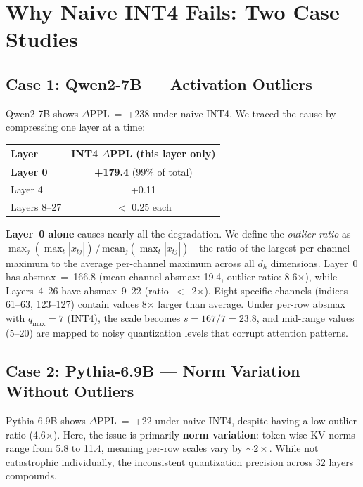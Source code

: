 \documentclass[11pt]{article}
\begin{document}
\section{Why Naive INT4 Fails: Two Case Studies}

\subsection{Case 1: Qwen2-7B --- Activation Outliers}

Qwen2-7B shows $\Delta$PPL~=~+238 under naive INT4. We traced the cause by compressing one layer at a time:

\begin{table}[h]
\centering
\small
\begin{tabular}{lc}
\toprule
Layer & INT4 $\Delta$PPL (this layer only) \\
\midrule
\textbf{Layer 0} & \textbf{+179.4} (99\% of total) \\
Layer 4 & +0.11 \\
Layers 8--27 & $<$ 0.25 each \\
\bottomrule
\end{tabular}
\end{table}

\textbf{Layer~0 alone} causes nearly all the degradation. We define the \emph{outlier ratio} as $\max_j (\max_t |x_{tj}|) \,/\, \text{mean}_j (\max_t |x_{tj}|)$---the ratio of the largest per-channel maximum to the average per-channel maximum across all $d_h$ dimensions. Layer~0 has absmax~=~166.8 (mean channel absmax: 19.4, outlier ratio: 8.6$\times$), while Layers~4--26 have absmax~9--22 (ratio~$<$~2$\times$). Eight specific channels (indices 61--63, 123--127) contain values 8$\times$ larger than average. Under per-row absmax with $q_{\max}=7$ (INT4), the scale becomes $s=167/7=23.8$, and mid-range values (5--20) are mapped to noisy quantization levels that corrupt attention patterns.

\subsection{Case 2: Pythia-6.9B --- Norm Variation Without Outliers}

Pythia-6.9B shows $\Delta$PPL~=~+22 under naive INT4, despite having a low outlier ratio (4.6$\times$). Here, the issue is primarily \textbf{norm variation}: token-wise KV norms range from 5.8 to 11.4, meaning per-row scales vary by ${\sim}2\times$. While not catastrophic individually, the inconsistent quantization precision across 32 layers compounds.
\end{document}
